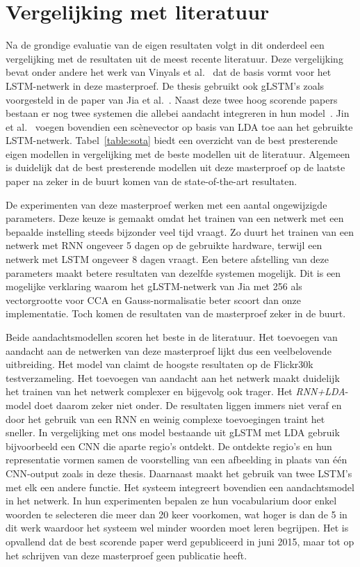 \section{Vergelijking met literatuur} %
\label{sec:vergelijking_met_literatuur}
Na de grondige evaluatie van de eigen resultaten volgt in dit onderdeel een vergelijking met de resultaten uit de meest recente literatuur.
Deze vergelijking bevat onder andere het werk van Vinyals et al.~\cite{Google} dat de basis vormt voor het LSTM-netwerk in deze masterproef. 
De thesis gebruikt ook gLSTM's zoals voorgesteld in de paper van Jia et al.~\cite{Fernando2015}.
Naast deze twee hoog scorende papers bestaan er nog twee systemen die allebei aandacht integreren in hun model~\cite{Jin2015,Xu2015}.
Jin et al.~\cite{Jin2015} voegen bovendien een sc\`enevector op basis van LDA toe aan het gebruikte LSTM-netwerk.
Tabel~\ref{table:sota} biedt een overzicht van de best presterende eigen modellen in vergelijking met de beste modellen uit de literatuur.
Algemeen is duidelijk dat de best presterende modellen uit deze masterproef op de laatste paper na zeker in de buurt komen van de state-of-the-art resultaten.

De experimenten van deze masterproef werken met een aantal ongewijzigde parameters.
Deze keuze is gemaakt omdat het trainen van een netwerk met een bepaalde instelling steeds bijzonder veel tijd vraagt.
Zo duurt het trainen van een netwerk met RNN ongeveer 5 dagen op de gebruikte hardware, terwijl een netwerk met LSTM ongeveer 8 dagen vraagt.
Een betere afstelling van deze parameters maakt betere resultaten van dezelfde systemen mogelijk.
Dit is een mogelijke verklaring waarom het gLSTM-netwerk van Jia met 256 als vectorgrootte voor CCA en Gauss-normalisatie beter scoort dan onze implementatie.
Toch komen de resultaten van de masterproef zeker in de buurt.

Beide aandachtsmodellen scoren het beste in de literatuur. Het toevoegen van aandacht aan de netwerken van deze masterproef lijkt dus een veelbelovende uitbreiding.
Het model van \cite{Jin2015} claimt de hoogste resultaten op de Flickr30k testverzameling.
Het toevoegen van aandacht aan het netwerk maakt duidelijk het trainen van het netwerk complexer en bijgevolg ook trager.
Het \emph{RNN+LDA}-model doet daarom zeker niet onder. De resultaten liggen immers niet veraf en door het gebruik van een RNN en weinig complexe toevoegingen traint het sneller.
In vergelijking met ons model bestaande uit gLSTM met LDA gebruik~\cite{Jin2015} bijvoorbeeld een CNN die aparte regio's ontdekt. De ontdekte regio's en hun representatie vormen samen de voorstelling van een afbeelding in plaats van \'e\'en CNN-output zoals in deze thesis. Daarnaast maakt het gebruik van twee LSTM's met elk een andere functie. Het systeem integreert bovendien een aandachtsmodel in het netwerk.
In hun experimenten bepalen ze hun vocabularium door enkel woorden te selecteren die meer dan 20 keer voorkomen, wat hoger is dan de 5 in dit werk waardoor het systeem wel minder woorden moet leren begrijpen.
Het is opvallend dat de best scorende paper werd gepubliceerd in juni 2015, maar tot op het schrijven van deze masterproef geen publicatie heeft.

